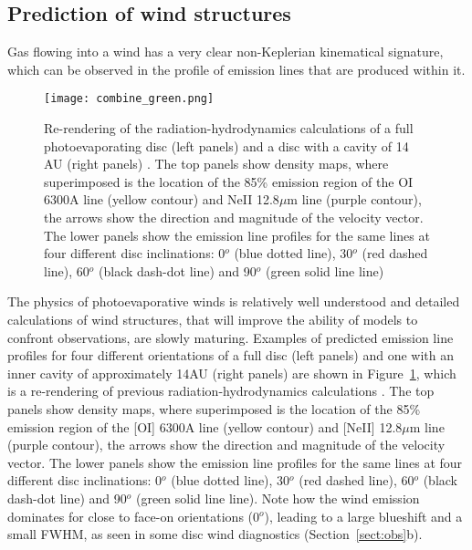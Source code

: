 \documentclass{rsos}
\begin{document}
\subsection{Prediction of wind structures}

Gas flowing into a wind has a very clear non-Keplerian kinematical signature, which can be observed in the profile of emission lines that are produced within it. 

\begin{figure}[h]
\centering
\texttt{[image: combine\_green.png]}
\caption{Re-rendering of the radiation-hydrodynamics calculations of a full photoevaporating disc (left panels) and a disc with a cavity of 14 AU (right panels)  \cite{2010MNRAS.406.1553E}. The top panels show density maps, where superimposed is the location of the 85\% emission region of the OI 6300A line (yellow contour) and NeII 12.8$\mu$m line (purple contour), the arrows show the direction and magnitude of the velocity vector.
The lower panels show the emission line profiles for  the same lines at four different disc inclinations: 0$^o$ (blue dotted line), 30$^o$ (red dashed line),  60$^o$ (black  dash-dot line) and 90$^o$ (green solid line line)}\label{fig:profiles}
\end{figure}

The physics of photoevaporative winds is relatively well understood and detailed calculations of wind structures, that will improve the ability of models to confront observations, are slowly maturing. Examples of predicted emission line profiles for four different orientations of a full disc (left panels) and one with an inner cavity of approximately 14AU (right panels) are shown in Figure~\ref{fig:profiles}, which is a re-rendering of previous radiation-hydrodynamics calculations \cite{2010MNRAS.406.1553E}. The top panels show density maps, where superimposed is the location of the 85\% emission region of the [OI] 6300A line (yellow contour) and [NeII] 12.8$\mu$m line (purple contour), the arrows show the direction and magnitude of the velocity vector.
The lower panels show the emission line profiles for  the same lines at four different disc inclinations: 0$^o$ (blue dotted line), 30$^o$ (red dashed line),  60$^o$ (black  dash-dot line) and 90$^o$ (green solid line line). Note how the wind emission dominates for close to face-on orientations (0$^o$), leading to a large blueshift and a small FWHM, as seen in some disc wind diagnostics (Section~\ref{sect:obs}b). 
\end{document}
